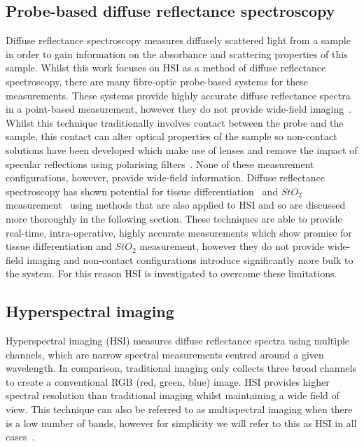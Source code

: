 \subsection{Probe-based diffuse reflectance spectroscopy}
Diffuse reflectance spectroscopy measures diffusely scattered light from a sample in order to gain information on the absorbance and scattering properties of this sample. Whilst this work focuses on HSI as a method of diffuse reflectance spectroscopy, there are many fibre-optic probe-based systems for these measurements. These systems provide highly accurate diffuse reflectance spectra in a point-based measurement, however they do not provide wide-field imaging~\cite{Nishidate2015}. 
Whilst this technique traditionally involves contact between the probe and the sample, this contact can alter optical properties of the sample so non-contact solutions have been developed which make use of lenses and remove the impact of specular reflections using polarising filters~\cite{Bish2011, Zhu2012}. None of these measurement configurations, however, provide wide-field information. Diffuse reflectance spectroscopy has shown potential for tissue differentiation~\cite{Skyrman2022} and $StO_2$ measurement~\cite{Fredriksson2020} using methods that are also applied to HSI and so are discussed more thoroughly in the following section. These techniques are able to provide real-time, intra-operative, highly accurate measurements which show promise for tissue differentiation and $StO_2$ measurement, however they do not provide wide-field imaging and non-contact configurations introduce significantly more bulk to the system. For this reason HSI is investigated to overcome these limitations. 

\subsection{Hyperspectral imaging}
Hyperspectral imaging (HSI) measures diffuse reflectance spectra using multiple channels, which are narrow spectral measurements centred around a given wavelength. In comparison, traditional imaging only collects three broad channels to create a conventional RGB (red, green, blue) image. HSI provides higher spectral resolution than traditional imaging whilst maintaining a wide field of view. This technique can also be referred to as multispectral imaging when there is a low number of bands, however for simplicity we will refer to this as HSI in all cases~\cite{Clancy2020}. 

